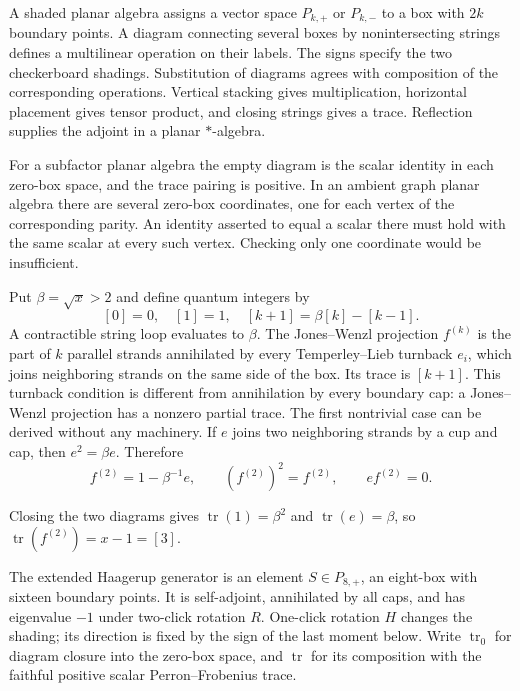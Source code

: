 A shaded planar algebra assigns a vector space $P_{k,+}$ or
$P_{k,-}$ to a box with $2k$ boundary points. A diagram connecting
several boxes by nonintersecting strings defines a multilinear
operation on their labels. The signs specify the two checkerboard
shadings. Substitution of diagrams agrees with composition of the
corresponding operations. Vertical stacking gives multiplication,
horizontal placement gives tensor product, and closing strings
gives a trace. Reflection supplies the adjoint in a planar
$*$-algebra.

For a subfactor planar algebra the empty diagram is the scalar
identity in each zero-box space, and the trace pairing is positive.
In an ambient graph planar algebra there are several zero-box
coordinates, one for each vertex of the corresponding parity.
An identity asserted to equal a scalar there must hold with the
same scalar at every such vertex. Checking only one coordinate
would be insufficient.

Put $\beta=\sqrt x>2$ and define quantum integers by
\[
 [0]=0,\quad[1]=1,\quad [k+1]=\beta[k]-[k-1].
\]
A contractible string loop evaluates to $\beta$. The
Jones--Wenzl projection $f^{(k)}$ is the part of $k$ parallel
strands annihilated by every Temperley--Lieb turnback $e_i$,
which joins neighboring strands on the same side of the box.
Its trace is $[k+1]$. This turnback condition is different from
annihilation by every boundary cap: a Jones--Wenzl projection
has a nonzero partial trace.
The first nontrivial case can be derived without any machinery.
If $e$ joins two neighboring strands by a cup and cap, then
$e^2=\beta e$. Therefore
\[
 f^{(2)}=1-\beta^{-1}e,
 \qquad (f^{(2)})^2=f^{(2)},\qquad ef^{(2)}=0.
\]


Closing the two diagrams gives
$\operatorname{tr}(1)=\beta^2$ and
$\operatorname{tr}(e)=\beta$, so
$\operatorname{tr}(f^{(2)})=x-1=[3]$.

The extended Haagerup generator is an element
$S\in P_{8,+}$, an eight-box with sixteen boundary points.
It is self-adjoint, annihilated by all caps, and has eigenvalue
$-1$ under two-click rotation $R$. One-click rotation $H$
changes the shading; its direction is fixed by the sign of the
last moment below.
Write $\operatorname{tr}_0$ for diagram closure into the zero-box
space, and $\operatorname{tr}$ for its composition with the
faithful positive scalar Perron--Frobenius trace.

